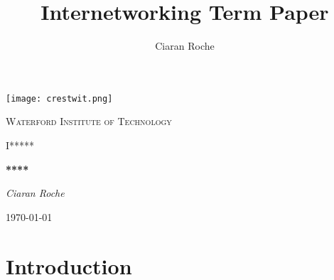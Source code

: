\documentclass[11pt]{article}
\title{Internetworking Term Paper}
\author{Ciaran Roche}
\begin{document}
\begin{titlepage}
	\centering
	\texttt{[image: crestwit.png]}\par\vspace{1cm}
	{\scshape\LARGE Waterford Institute of Technology \par}
	\vspace{1cm}
	{\scshape\Large I***** \par}
	\vspace{1.5cm}
	{\huge\bfseries *****\par}
	\vspace{2cm}
	{\Large\itshape Ciaran Roche\par}
	\vfill
	{\large \today\par}
\end{titlepage}

\begin{abstract}

\end{abstract}

\section{Introduction}
\end{document}
